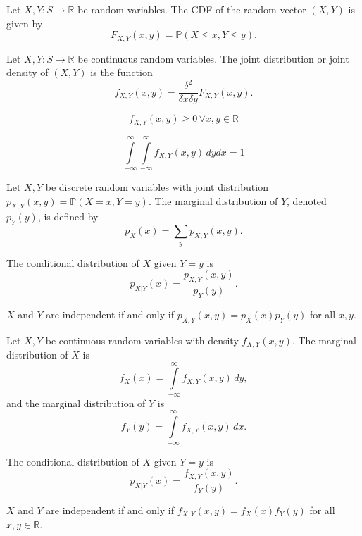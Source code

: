 \documentclass{article}
\begin{document}
\medskip
{}

    Let $X,Y:S\to\mathbb R$ be random variables. The CDF of the random vector $(X,Y)$ is given by $$F_{X,Y}(x, y) = \mathbb P(X\leq x, Y\leq y).$$

\medskip
{}

    Let $X,Y:S \to \mathbb R$ be continuous random variables. The joint distribution or joint density of $(X,Y)$ is the function $$f_{X,Y}(x, y) = \frac{\delta^2}{\delta x \delta y} F_{X,Y}(x,y).$$
    
    $$f_{X,Y}(x,y) \geq 0\,\forall x,y \in \mathbb R$$
    
    $$\int\limits_{-\infty}^\infty \int\limits_{-\infty}^\infty f_{X,Y}(x,y)\,dydx = 1$$

\medskip
{}

    Let $X, Y$ be discrete random variables with joint distribution $p_{X,Y}(x,y)=\mathbb P(X=x, Y=y)$. The marginal distribution of $Y$, denoted $p_Y(y)$, is defined by $$p_X(x) = \sum_{y}p_{X,Y}(x,y).$$

\medskip
{}

    The conditional distribution of $X$ given $Y=y$ is $$p_{X|Y}(x) = \frac{p_{X,Y}(x,y)}{p_Y(y)}.$$

\medskip
{}

    $X$ and $Y$ are independent if and only if $p_{X,Y}(x,y) = p_X(x)p_Y(y)$ for all $x,y$.

\medskip
{}

    Let $X,Y$ be continuous random variables with density $f_{X,Y}(x,y)$. The marginal distribution of $X$ is $$f_X(x) = \int\limits_{-\infty}^\infty f_{X,Y}(x,y)\,dy,$$ and the marginal distribution of $Y$ is $$f_Y(y) = \int\limits_{-\infty}^\infty f_{X,Y}(x,y)\,dx.$$

\medskip
{}

    The conditional distribution of $X$ given $Y=y$ is $$p_{X|Y}(x) = \frac{f_{X,Y}(x,y)}{f_Y(y)}.$$

\medskip
{}

    $X$ and $Y$ are independent if and only if $f_{X,Y}(x,y) = f_X(x)f_Y(y)$ for all $x,y \in \mathbb R$.
\end{document}
